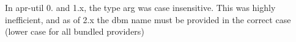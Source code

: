 
\begin{DoxyRefList}
\item[\label{bug__bug000001}%
\hypertarget{bug__bug000001}{}%
Global \hyperlink{group___a_p_r___util___d_b_m_gaf7295ba8157f487b78319e168e1344b4}{apr\-\_\-dbm\-\_\-open\-\_\-ex} (\hyperlink{structapr__dbm__t}{apr\-\_\-dbm\-\_\-t} $\ast$$\ast$dbm, const char $\ast$type, const char $\ast$name, apr\-\_\-int32\-\_\-t mode, apr\-\_\-fileperms\-\_\-t perm, apr\-\_\-pool\-\_\-t $\ast$cntxt)]In apr-\/util 0. and 1.\-x, the type arg was case insensitive. This was highly inefficient, and as of 2.\-x the dbm name must be provided in the correct case (lower case for all bundled providers) 
\end{DoxyRefList}